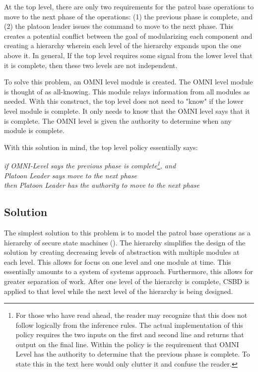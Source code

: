 \documentclass[../../main/main.tex]{subfiles}
\begin{document}
At the top level, there are only two requirements for the patrol base operations to move to the next phase of the operations: (1) the previous phase is complete, and (2) the platoon leader issues the command to move to the next phase.  This creates a potential conflict between the goal of modularizing each component and creating a hierarchy wherein each level of the hierarchy expands upon the one above it.  In general, If the top level requires some signal from the lower level that it is complete, then these two levels are not independent. 

To solve this problem, an OMNI level module is created.  The OMNI level module is thought of as all-knowing.  This module relays information from all modules as needed.  With this construct, the top level does not need to "know" if the lower level module is complete.  It only needs to know that the OMNI level says that it is complete.  The OMNI level is given the authority to determine when any module is complete.

With this solution in mind, the top level policy essentially says:

\begin{center}
\textit{if OMNI-Level says the previous phase is complete\footnote{For those who have read ahead, the reader may recognize that this does not follow logically from the inference rules.  The actual implementation of this policy requires the two inputs on the first and second line and returns that output on the final line.  Within the policy is the requirement that OMNI Level has the authority to determine that the previous phase is complete.  To state this in the text here would only clutter it and confuse the reader.}, and \\
Platoon Leader says move to the next phase\\
 then Platoon Leader has the authority to move to the next phase}
\end{center}

\subsection{Solution}
The simplest solution to this problem is to model the patrol base operations as a hierarchy of secure state machines ().  The hierarchy simplifies the design of the solution by creating decreasing levels of abstraction with multiple modules at each level.  This allows for focus on one level and one module at time. This essentially amounts to a system of systems approach.  Furthermore, this allows for greater separation of work.  After one level of the hierarchy is complete, CSBD is applied to that level while the next level of the hierarchy is being designed.
\end{document}
